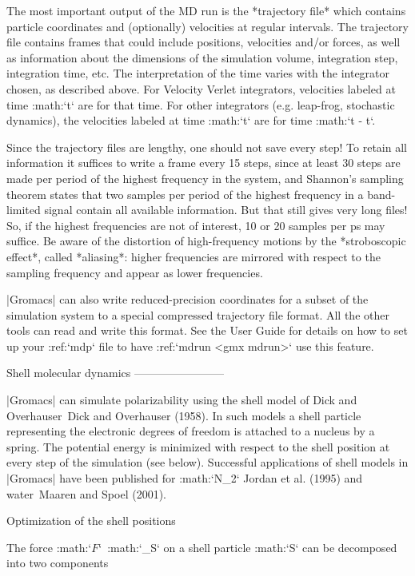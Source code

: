 The most important output of the MD run is the *trajectory
file* 
which contains particle coordinates and (optionally) velocities at
regular intervals. The trajectory file contains frames that could
include positions, velocities and/or forces, as well as information
about the dimensions of the simulation volume, integration step,
integration time, etc. The interpretation of the time varies with the
integrator chosen, as described above. For Velocity Verlet integrators,
velocities labeled at time :math:`t` are for that time. For other
integrators (e.g. leap-frog, stochastic dynamics), the velocities
labeled at time :math:`t` are for time
:math:`t - {{}{{\Delta t}}}`.

Since the trajectory files are lengthy, one should not save every step!
To retain all information it suffices to write a frame every 15 steps,
since at least 30 steps are made per period of the highest frequency in
the system, and Shannon’s sampling
theorem
states that two samples per period of the highest frequency in a
band-limited signal contain all available information. But that still
gives very long files! So, if the highest frequencies are not of
interest, 10 or 20 samples per ps may suffice. Be aware of the
distortion of high-frequency motions by the *stroboscopic effect*,
called *aliasing*: higher frequencies are mirrored with respect to the
sampling frequency and appear as lower frequencies.

|Gromacs| can also write reduced-precision coordinates for a subset of the
simulation system to a special compressed trajectory file format. All
the other tools can read and write this format. See the User Guide for
details on how to set up your :ref:`mdp` file to have
:ref:`mdrun <gmx mdrun>` use this feature.

Shell molecular dynamics
------------------------

|Gromacs| can simulate polarizability
using the shell model
of Dick and
Overhauser Dick and Overhauser (1958). In such models a shell particle
representing the electronic degrees of freedom is attached to a nucleus
by a spring. The potential energy is minimized with respect to the shell
position at every step of the simulation (see below). Successful
applications of shell models in |Gromacs| have been published for
:math:`N_2` Jordan et al. (1995) and water Maaren and Spoel (2001).

Optimization of the shell positions
~~~~~~~~~~~~~~~~~~~~~~~~~~~~~~~~~~~

The force 
:math:`{\mbox{\boldmath ${F}$}}`\ :math:`_S` on a shell
particle :math:`S` can be decomposed into two components

